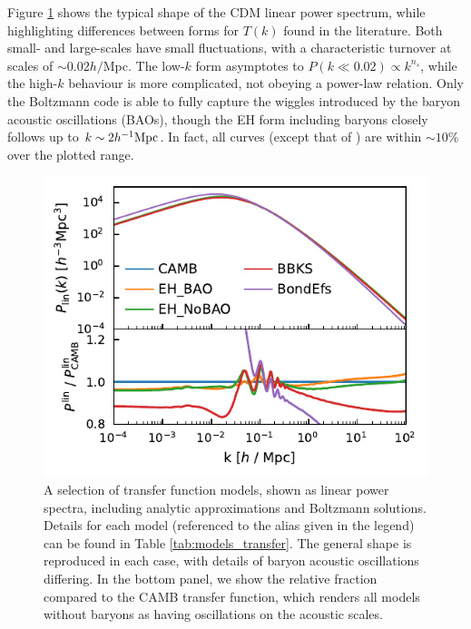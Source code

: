 \documentclass[5p,aas_macros]{elsarticle}
\begin{document}
Figure \ref{fig:power} shows the typical shape of the CDM linear power spectrum, while highlighting differences between forms for $T(k)$ found in the literature. Both small- and large-scales have small fluctuations, with a characteristic turnover at scales of $\sim 0.02h/$Mpc. The low-$k$ form asymptotes to $P(k \ll 0.02 ) \propto k^{n_s}$, while the high-$k$ behaviour is more complicated, not obeying a power-law relation. Only the Boltzmann code is able to fully capture the wiggles introduced by the baryon acoustic oscillations (BAOs), though the EH form including baryons closely follows up to $k \sim 2 h^{-1}{\rm Mpc}$. 
In fact, all curves (except that of \citet{Bond1984}) are within $\sim 10\%$ over the plotted range.

\begin{figure}
  \centering
  \includegraphics[width=\linewidth]{figures/transfer_models.pdf}
  \caption[Comparison of transfer function models]{A selection of transfer function models, shown as linear power spectra, including analytic approximations \citep{Bond1984,Bardeen1986,Eisenstein1998} and Boltzmann solutions. Details for each model (referenced to the alias given in the legend) can be found in Table \ref{tab:models_transfer}. The general shape is reproduced in each case, with details of baryon acoustic oscillations differing. In the bottom panel, we show the relative fraction compared to the CAMB transfer function, which renders all models without baryons as having oscillations on the acoustic scales.}
  \label{fig:power}
\end{figure}
  
\end{document}
